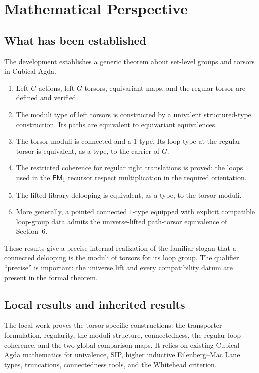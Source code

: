 \section{Mathematical Perspective}
\label{ch:perspective}

\subsection{What has been established}
The development establishes a generic theorem about set-level groups and torsors in Cubical Agda.
\begin{enumerate}[label=\arabic*.]
\item Left $G$-actions, left $G$-torsors, equivariant maps, and the regular torsor are defined and verified.
\item The moduli type of left torsors is constructed by a univalent structured-type construction. Its paths are equivalent to equivariant equivalences.
\item The torsor moduli is connected and a $1$-type. Its loop type at the regular torsor is equivalent, as a type, to the carrier of $G$.
\item The restricted coherence for regular right translations is proved: the loops used in the $\mathsf{EM}_1$ recursor respect multiplication in the required orientation.
\item The lifted library delooping is equivalent, as a type, to the torsor moduli.
\item More generally, a pointed connected $1$-type equipped with explicit compatible loop-group data admits the universe-lifted path-torsor equivalence of Section~6.
\end{enumerate}

These results give a precise internal realization of the familiar slogan that a connected delooping is the moduli of torsors for its loop group. The qualifier ``precise'' is important: the universe lift and every compatibility datum are present in the formal theorem.

\subsection{Local results and inherited results}
The local work proves the torsor-specific constructions: the transporter formulation, regularity, the moduli structure, connectedness, the regular-loop coherence, and the two global comparison maps. It relies on existing Cubical Agda mathematics for univalence, SIP, higher inductive Eilenberg--Mac Lane types, truncations, connectedness tools, and the Whitehead criterion.

